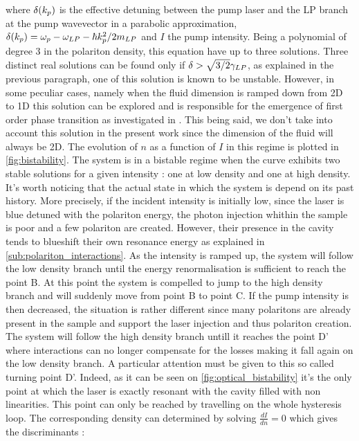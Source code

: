 where $\delta(k_p)$ is the effective detuning between the pump laser and the LP branch at the pump wavevector in a parabolic approximation, $\delta(k_p) = \omega_p - \omega_{LP}-{\hbar k_p^2}/2m_{LP}$ and $I$ the pump intensity. Being a polynomial of degree 3 in the polariton density, this equation have up to three solutions.
Three distinct real solutions can be found only if $\delta>\sqrt{3/2}\gamma_{LP}$, as explained in the previous paragraph, one of this solution is known to be unstable. However, in some peculiar cases, namely when the fluid dimension is ramped down from 2D to 1D this solution can be explored and is responsible for the emergence of first order phase transition as investigated in \cite{li_dissipative_2022}.
This being said, we don't take into account this solution in the present work since the dimension of the fluid will always be 2D.
The evolution of $n$ as a function of $I$ in this regime is plotted in \autoref{fig:bistability}. The system is in a bistable regime when the curve exhibits two stable solutions for a given intensity : one at low density and one at high density.
It's worth noticing that the actual state in which the system is depend on its past history. More precisely, if the incident intensity is initially low, since the laser is blue detuned with the polariton energy, the photon injection whithin the sample is poor and a few polariton are created. However, their presence in the cavity tends to blueshift their own resonance energy as explained in \autoref{sub:polariton_interactions}. As the intensity is ramped up, the system will follow the low density branch until the energy renormalisation is sufficient to reach the point B. At this point the system is compelled to jump to the high density branch and will suddenly move from point B to point C.
If the pump intensity is then decreased, the situation is rather different since many polaritons are already present in the sample and support the laser injection and thus polariton creation. The system will follow the high density branch untill it reaches the point D' where interactions can no longer compensate for the losses making it fall again on the low density branch. A particular attention must be given to this so called turning point D'. Indeed, as it can be seen on \autoref{fig:optical_bistability} it's the only point at which the laser is exactly resonant with the cavity filled with non linearities.
This point can only be reached by travelling on the whole hysteresis loop. The corresponding density can determined by solving $\frac{dI}{dn}=0$ which gives the discriminants :

